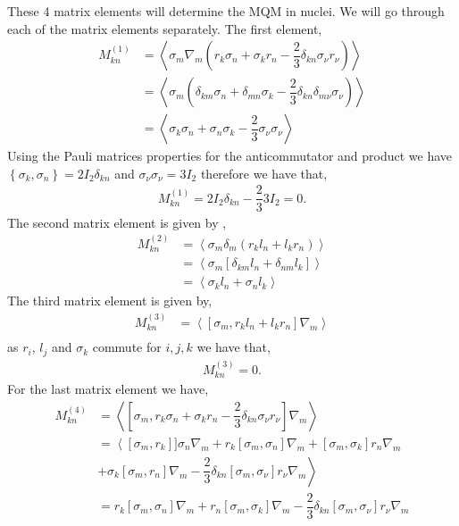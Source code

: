 \documentclass[8pt,a4paper, twoside]{report}
\begin{document}
These 4 matrix elements will determine the MQM in nuclei. We will go through each of the matrix elements separately. The first element,
\begin{align*}
M^{(1)}_{kn} &= \left<\sigma_m\nabla_m\left(r_k\sigma_n + \sigma_kr_n - \dfrac{2}{3}\delta_{kn}\sigma_\nu r_\nu\right)\right> \\
&= \left<\sigma_m\left(\delta_{km}\sigma_{n} + \delta_{mn}\sigma_k - \dfrac{2}{3}\delta_{kn}\delta_{m\nu}\sigma_{\nu}\right)\right> \\
&= \left<\sigma_k\sigma_n + \sigma_n\sigma_k - \dfrac{2}{3}\sigma_{\nu}\sigma_{\nu} \right>
\end{align*}
Using the Pauli matrices properties for the anticommutator and product we have $\left\{\sigma_k, \sigma_n\right\} = 2I_{2}\delta_{kn}$ and $\sigma_{\nu}\sigma_{\nu} = 3I_{2}$ therefore we have that,
\begin{align*}
M^{(1)}_{kn} = 2I_{2}\delta_{kn} - \dfrac{2}{3} 3I_{2} = 0.
\end{align*}
The second matrix element is given by ,
\begin{align*}
M^{(2)}_{kn} &= \left<\sigma_m\delta_m\left(r_kl_n + l_kr_n\right)\right> \\
 &= \left<\sigma_m \left[\delta_{km}l_n + \delta_{nm}l_k\right]\right> \\
&= \left<\sigma_k l_n + \sigma_nl_k\right>
\end{align*}
The third matrix element is given by,
\begin{align*}
M^{(3)}_{kn} &= \left<\left[\sigma_m, r_kl_n + l_kr_n\right]\nabla_m\right> \\
\end{align*}
as $r_i$, $l_{j}$ and $\sigma_k$ commute for $i,j,k$ we have that,
\begin{align*}
M^{(3)}_{kn} = 0.
\end{align*}
For the last matrix element we have,
\begin{align*}
M^{(4)}_{kn} &= \left<\left[\sigma_m, r_k\sigma_n + \sigma_kr_n - \dfrac{2}{3}\delta_{kn}\sigma_{\nu}r_{\nu}\right] \nabla_m\right> \\
&= \left< \left[\sigma_m,r_k\right]]\sigma_n\nabla_m + r_k\left[\sigma_m,\sigma_n\right]\nabla_m + \left[\sigma_m,\sigma_k\right]r_n\nabla_m \right. \\ 
&\left. + \sigma_k\left[\sigma_m,r_n\right]\nabla_m - \dfrac{2}{3}\delta_{kn}\left[\sigma_m,\sigma_{\nu}\right]r_{\nu}\nabla_m\right> \\
&= r_k\left[\sigma_m,\sigma_n\right]\nabla_m + r_n \left[\sigma_m,\sigma_k\right]\nabla_m - \dfrac{2}{3}\delta_{kn}\left[\sigma_m,\sigma_{\nu}\right]r_{\nu}\nabla_{m}
\end{align*}
\end{document}
